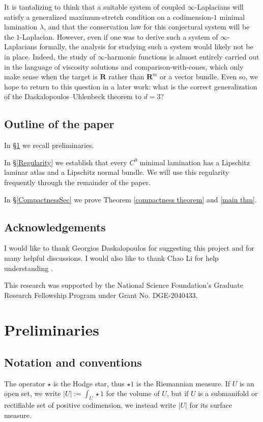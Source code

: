\documentclass[reqno,11pt]{amsart}
\newcommand{\RR}{\mathbf{R}}
\theoremstyle{definition}
\numberwithin{equation}{section}
\begin{document}
It is tantalizing to think that a suitable system of coupled $\infty$-Laplacians will satisfy a generalized maximum-stretch condition on a codimension-$1$ minimal lamination $\lambda$, and that the conservation law for this conjectural system will be the $1$-Laplacian.
However, even if one was to derive such a system of $\infty$-Laplacians formally, the analysis for studying such a system would likely not be in place.
Indeed, the study of $\infty$-harmonic functions is almost entirely carried out in the language of viscosity solutions and comparison-with-cones, which only make sense when the target is $\RR$ rather than $\RR^m$ or a vector bundle.
Even so, we hope to return to this question in a later work: what is the correct generalization of the Daskalopoulos--Uhlenbeck theorem to $d = 3$?

\subsection{Outline of the paper}
In \S\ref{Prelims} we recall preliminaries.

In \S\ref{Regularity} we establish that every $C^0$ minimal lamination has a Lipschitz laminar atlas and a Lipschitz normal bundle.
We will use this regularity frequently through the remainder of the paper.

In \S\ref{CompactnessSec} we prove Theorem \ref{compactness theorem} and \ref{main thm}.


\subsection{Acknowledgements}
I would like to thank Georgios Daskalopoulos for suggesting this project and for many helpful discussions.
I would also like to thank Chao Li for help understanding \cite{Chodosh2021}.

This research was supported by the National Science Foundation's Graduate Research Fellowship Program under Grant No. DGE-2040433.




\section{Preliminaries}\label{Prelims}
\subsection{Notation and conventions}
The operator $\star$ is the Hodge star, thus $\star 1$ is the Riemannian measure.
If $U$ is an open set, we write $|U| := \int_U \star 1$ for the volume of $U$, but if $U$ is a submanifold or rectifiable set of positive codimension, we instead write $|U|$ for its surface measure.
\end{document}
